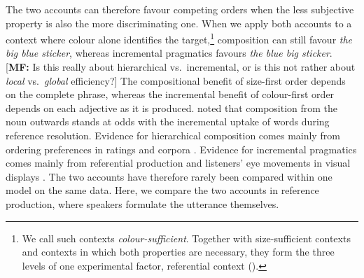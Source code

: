 \documentclass[10pt,a4paper,fleqn]{article}
\newcommand{\mf}[1]{\textcolor{shimmer-main}{[\textbf{MF: }{#1}]}}
\begin{document}
The two accounts can therefore favour competing orders when the less subjective property is also the more discriminating one.
When we apply both accounts to a context where colour alone identifies the target,\footnote{We call such contexts \emph{colour-sufficient}. Together with size-sufficient contexts and contexts in which both properties are necessary, they form the three levels of one experimental factor, referential context ().} composition can still favour \emph{the big blue sticker}, whereas incremental pragmatics favours \emph{the blue big sticker}. \mf{Is this really about hierarchical vs.~incremental, or is this not rather about \emph{local} vs.~\emph{global} efficiency?}
The compositional benefit of size-first order depends on the complete phrase, whereas the incremental benefit of colour-first order depends on each adjective as it is produced.
\citet[p.~7:19]{scontras2019grammatical} noted that composition from the noun outwards stands at odds with the incremental uptake of words during reference resolution.
Evidence for hierarchical composition comes mainly from ordering preferences in ratings and corpora \citep{scontras2017subjectivity,trainin2023subjectivity,scontras2023adjective}.
Evidence for incremental pragmatics comes mainly from referential production and listeners' eye movements in visual displays \citep{fukumura2018ordering,rubio2021wordorder}.
The two accounts have therefore rarely been compared within one model on the same data.
Here, we compare the two accounts in reference production, where speakers formulate the utterance themselves.
\end{document}
